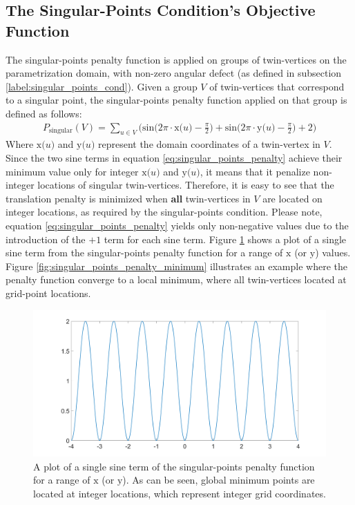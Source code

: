 \subsection{The Singular-Points Condition's Objective Function}
The singular-points penalty function is applied on groups of twin-vertices on the parametrization domain, with non-zero angular defect (as defined in subsection \ref{label:singular_points_cond}). Given a group $V$ of twin-vertices that correspond to a singular point, the singular-points penalty function applied on that group is defined as follows:
\begin{equation}\label{eq:singular_points_penalty}
\begin{split}
P_{\mathrm{singular}}\left(V\right) = \sum_{u \in V} \bigg( \mathrm{sin} \Big( 2\pi\cdot\mathrm{x}\big(u\big) - \frac{\pi}{2}\Big) + \mathrm{sin} \Big( 2\pi\cdot\mathrm{y}\big(u\big) - \frac{\pi}{2}\Big) + 2 \bigg)
\end{split}
\end{equation}
Where $\mathrm{x}\big(u\big)$ and $\mathrm{y}\big(u\big)$ represent the domain coordinates of a twin-vertex in $V$. Since the two sine terms in equation \ref{eq:singular_points_penalty} achieve their minimum value only for integer $\mathrm{x}\big(u\big)$ and $\mathrm{y}\big(u\big)$, it means that it penalize non-integer locations of singular twin-vertices. Therefore, it is easy to see that the translation penalty is minimized when \textbf{all} twin-vertices in $V$ are located on integer locations, as required by the singular-points condition. Please note, equation \ref{eq:singular_points_penalty} yields only non-negative values due to the introduction of the $+1$ term for each sine term. Figure \ref{fig:singular_points_penalty_sine_term} shows a plot of a single sine term from the singular-points penalty function for a range of $\mathrm{x}$ (or $\mathrm{y}$) values. Figure \ref{fig:singular_points_penalty_minimum} illustrates an example where the penalty function converge to a local minimum, where all twin-vertices located at grid-point locations.
\begin{figure}[ht]
\centering
\includegraphics[width=13cm]{figures/singular_points/singular_points_penalty_function_sine_term.png}
\caption[The Singular-Points Penalty Function (Single Sine Term)]{A plot of a single sine term of the singular-points penalty function for a range of $\mathrm{x}$ (or $\mathrm{y}$). As can be seen, global minimum points are located at integer locations, which represent integer grid coordinates.}
\label{fig:singular_points_penalty_sine_term}
\end{figure}
